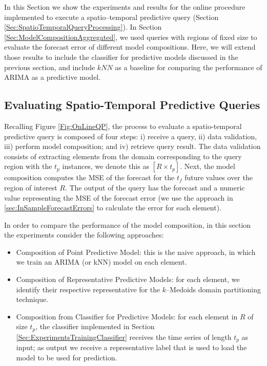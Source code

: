 In this Section we show the experiments and results for the online procedure implemented to execute a spatio--temporal predictive query (Section \ref{Sec:SpatioTemporalQueryProcessing}). In Section \ref{Sec:ModelCompositionAggregated}, we used queries with regions of fixed size to evaluate the forecast error of different model compositions. Here, we will extend those results to include the classifier for predictive models discussed in the previous section, and include $kNN$ as a baseline for comparing the performance of ARIMA as a predictive model.

\subsection{Evaluating Spatio-Temporal Predictive Queries}
\label{Sec:ExperimentsQueries}

Recalling Figure \ref{Fig:OnLineQP}, the process to evaluate a spatio-temporal predictive query is composed of four steps: i) receive a query, ii) data validation, iii) perform model composition; and iv) retrieve query result. The data validation consists of extracting elements from the domain corresponding to the query region with the $t_p$ instances, we denote this as $[R \times t_{p}]$. Next, the model composition computes the MSE of the forecast for the $t_{f}$ future values over the region of interest $R$. The output of the query has the forecast and a numeric value representing the MSE of the forecast error (we use the approach in \ref{sec:InSampleForecastErrors} to calculate the error for each element). 

In order to compare the performance of the model composition, in this section the experiments consider the following approaches:
\begin{itemize}
	\item Composition of Point Predictive Model: this is the naive approach, in which we train an ARIMA (or kNN) model on each element.
	\item Composition of Representative Predictive Models: for each element, we identify their respective representative for the $k$--Medoids domain partitioning technique.
	\item Composition from Classifier for Predictive Models: for each element in $R$ of size $t_{p}$, the classifier implemented in Section \ref{Sec:ExperimentsTrainingClassifier} receives the time series of length $t_{p}$ as input; as output we receive a representative label that is used to load the model to be used for prediction.
\end{itemize}

